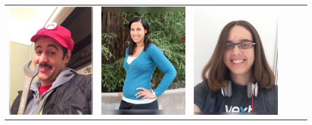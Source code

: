 \documentclass[landscape,a0paper,fontscale=0.292]{baposter}
\begin{document}
\begin{poster}
{\begin{center}
\begin{tabularx}{\linewidth}{X X X X X X}
{\centering \includegraphics[width=0.6\linewidth]{atacchet.jpg}}&
{\centering \includegraphics[width=0.6\linewidth]{onasafari.jpg}}&
{\centering \includegraphics[width=0.6\linewidth]{lapentab.jpg}}&

\end{tabularx}
\end{center}}
\end{poster}
\end{document}

